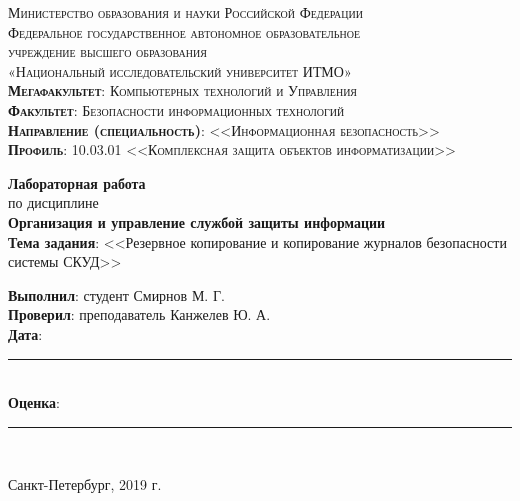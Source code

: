 \begin{titlepage}
	\begin{center}
		\textsc{
			\fontsize{12pt}{14pt}\selectfont
			Министерство образования и науки Российской Федерации\\
			Федеральное государственное автономное образовательное\\
			учреждение высшего образования\\
			«Национальный исследовательский университет ИТМО»\\
			\textbf{Мегафакультет}:  Компьютерных технологий и Управления\\
			\textbf{Факультет}: Безопасности информационных технологий\\
			\textbf{Направление (специальность)}: <<Информационная безопасность>>\\
			\textbf{Профиль}: 10.03.01 <<Комплексная защита объектов информатизации>>}
		
		\vfill
		
		\textbf{Лабораторная работа}\\
		по дисциплине\\
		\textbf{Организация и управление службой защиты информации}\\
	\vfill
	\textbf{Тема задания}: <<Резервное копирование и копирование журналов безопасности системы СКУД>>\\
	\end{center}

	\vfill
	
	\begin{flushright}
	\textbf{Выполнил}: студент Смирнов М. Г. \\
	\textbf{Проверил}: преподаватель Канжелев Ю. А.\\
		\vfill
	\textbf{Дата}: \rule{10em}{.1pt}\\
	\textbf{Оценка}: \rule{10em}{.1pt}\\

	\vfill
	


	\end{flushright}
	\vfill
	\begin{center}
		Санкт-Петербург, 2019 г.
	\end{center}
\end{titlepage}
